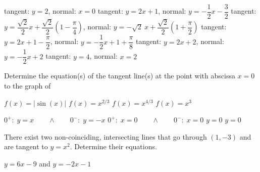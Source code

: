 \begin{Answer}\phantom{}
    
		\Question tangent: $y=2$, \quad normal: $x=0$
		\Question tangent: $y=2x+1$, \quad normal: $y=-\dfrac{1}{2} x-\dfrac{3}{2}$
		\Question tangent: $y=\dfrac{\sqrt{2}}{2}x+\dfrac{\sqrt{2}}{2}\left(1-\dfrac{\pi}{4}\right)$, \quad  normal: $y=-\sqrt{2}\ x+\dfrac{\sqrt{2}}{2}\left(1+\dfrac{\pi}{2}\right)$
		\Question tangent: $y=2x+1-\dfrac{\pi}{2}$, \quad  normal: $y=-\dfrac{1}{2} x+1+\dfrac{\pi}{8}$
    	\Question tangent: $y=2x+2$, \quad normal: $y=-\dfrac{1}{2}x+2$
    	\Question tangent: $y=4$, \quad normal: $x=2$
	
\end{Answer}

\begin{Exercise} Determine the equation(s) of the tangent line(s) at the point with abscissa $x=0$ to the graph of
	\begin{multicols}{2}
		\ifanalysis\Question[difficulty = 1]\fi\ifcalculus\Question[difficulty = 2]\fi $f(x)=|\sin(x)|$
		\Question[difficulty = 1] $f(x)=x^{2/3}$
		\Question[difficulty = 1] $f(x)=x^{4/3}$
		\Question[difficulty = 1] $f(x)=x^3$
	    \EndCurrentQuestion
	\end{multicols}

\end{Exercise}

\begin{Answer}\phantom{}
    \begin{multicols}{2}
	
	\Question $0^+ :\; y=x\qquad\wedge\qquad 0^- :\; y=-x$
	\Question $0^+ :\; x=0 \qquad\wedge\qquad 0^- :\; x=0 $
	\Question $y=0$
	\Question $y=0$
	\EndCurrentQuestion
	\end{multicols}
\end{Answer}

\begin{Exercise}[difficulty = 2] There exist two non-coinciding, intersecting lines that go through $(1,-3)$ and are tangent to $y=x^2$. Determine their equations.

\end{Exercise}

\begin{Answer}\phantom{}
	$y = 6x-9$ \;  and  \; $y = -2x-1$
\end{Answer}

